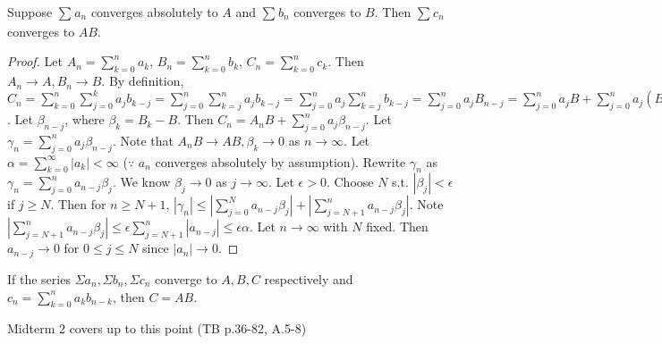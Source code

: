 \begin{thm}[50]
	Suppose $\sum_{}{a_{n}}$ converges absolutely to $A$ and $\sum_{}{b_{n}}$ converges to $B$. Then $\sum_{}{c_n}$ converges to $AB$.
	\begin{proof}
		Let $A_{n}=\sum_{k=0}^{n}{a_{k}}$, $B_{n}=\sum_{k=0}^{n}{b_{k}}$, $C_{n}=\sum_{k=0}^{n}{c_{k}}$.
		Then $A_{n} \to  A, B_{n}\to B$.
		By definition, $C_{n}=\sum_{k=0}^{n}{\sum_{j=0}^{k}{a_{j}b_{k-j}}}=\sum_{j=0}^{n}{\sum_{k=j}^{n}{a_j b_{k-j}}}=\sum_{j=0}^{n}{a_{j} \sum_{k=j}^{n}{b_{k-j}}}
			=\sum_{j=0}^{n}{a_{j}B_{n-j}}=\sum_{j=0}^{n}{a_{j}B}+\sum_{j=0}^{n}{a_{j}(B_{n-j}-B)}$. Let $\beta_{n-j}$, where $\beta_k=B_k -B$.
		Then $C_n=A_nB + \sum_{j=0}^{n}{a_{j}\beta_{n-j}}$. Let $\gamma_n=\sum_{j=0}^{n}{a_{j}\beta_{n-j}}$.
		Note that $A_nB \to AB, \beta_k \to 0$ as $n\to \infty$.
		Let $\alpha=\sum_{k=0}^{\infty}{|a_k|}<\infty $  ($\because$ $a_{n}$ converges absolutely by assumption). Rewrite $\gamma_n$ as $\gamma_n=\sum_{j=0}^{n}{a_{n-j} \beta_j}$. We know $\beta_j \to 0$ as $j\to \infty$.
		Let $\epsilon>0$. Choose $N$ s.t. $|\beta_j|<\epsilon$ if $j\ge N$.
		Then for $n\ge N+1$, $|\gamma_n|\le |\sum_{j=0}^{N}{a_{n-j}\beta_j}|+|\sum_{j=N+1}^{n}{a_{n-j}\beta_j}|$. Note $|\sum_{j=N+1}^{n}{a_{n-j}\beta_j}| \le \epsilon \sum_{j=N+1}^{n}{|a_{n-j}|}\le \epsilon \alpha$.
		Let $n\to \infty$ with $N$ fixed. Then $a_{n-j}\to 0$ for $0 \le j \le N$ since $|a_{n}|\to 0$.
	\end{proof}
\end{thm}

\begin{theorem}[51]
	If the series $\Sigma a_{n},\Sigma b_{n},\Sigma c_{n}$ converge to $A,B,C$ respectively and $c_{n}=\sum_{k=0}^{n}{a_k b_{n-k}}$, then $C=AB$.
\end{theorem}

Midterm 2 covers up to this point (TB p.36-82, A.5-8)
